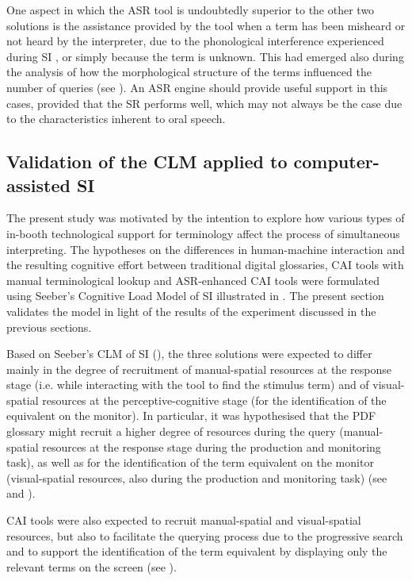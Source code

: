 One aspect in which the ASR tool is undoubtedly superior to the other two solutions is the assistance provided by the tool when a term has been misheard or not heard by the interpreter, due to the phonological interference experienced during SI \citep{diaz2019comprehension}, or simply because the term is unknown. This had emerged also during the analysis of how the morphological structure of the terms influenced the number of queries (see ). An ASR engine should provide useful support in this cases, provided that the SR performs well, which may not always be the case due to the characteristics inherent to oral speech.

\subsection{Validation of the CLM applied to computer-assisted SI} \label{validation}
The present study was motivated by the intention to explore how various types of in-booth technological support for terminology affect the process of simultaneous interpreting. The hypotheses on the differences in human-machine interaction and the resulting cognitive effort between traditional digital glossaries, CAI tools with manual terminological lookup and ASR-enhanced CAI tools were formulated using Seeber's Cognitive Load Model of SI illustrated in . The present section validates the model in light of the results of the experiment discussed in the previous sections.

Based on Seeber's CLM of SI (\citeyear{seeber_cognitive_2011,seeber_multimodal_2017}), the three solutions were expected to differ mainly in the degree of recruitment of manual-spatial resources at the response stage (i.e. while interacting with the tool to find the stimulus term) and of visual-spatial resources at the perceptive-cognitive stage (for the identification of the equivalent on the monitor). In particular, it was hypothesised that the PDF glossary might recruit a higher degree of resources during the query (manual-spatial resources at the response stage during the production and monitoring task), as well as for the identification of the term equivalent on the monitor (visual-spatial resources, also during the production and monitoring task) (see  and ).

CAI tools were also expected to recruit manual-spatial and visual-spatial resources, but also to facilitate the querying process due to the progressive search and to support the identification of the term equivalent by displaying only the relevant terms on the screen (see ).

